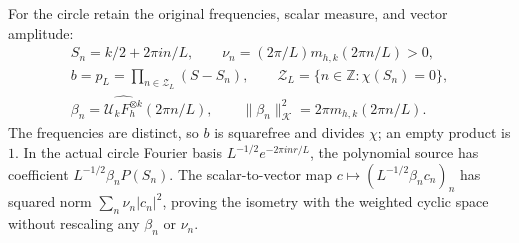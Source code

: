 \documentclass{article}
\begin{document}
For the circle retain the original frequencies, scalar measure, and
vector amplitude:
\[
 \begin{gathered}
 S_n=k/2+2\pi i n/L,\qquad
 \nu_n=(2\pi/L)m_{h,k}(2\pi n/L)>0,\\
 b=p_L=\prod_{n\in\mathcal Z_L}(S-S_n),\qquad
 \mathcal Z_L=\{n\in\mathbb Z:\chi(S_n)=0\},\\
 \beta_n=\widehat{\mathcal U_kF_h^{\otimes k}}(2\pi n/L),
 \qquad \|\beta_n\|_{\mathcal K}^2=2\pi m_{h,k}(2\pi n/L).
 \end{gathered}
 \tag{DC6}
\]
The frequencies are distinct, so $b$ is squarefree and divides
$\chi$; an empty product is $1$.
In the actual circle Fourier basis
$L^{-1/2}e^{-2\pi i nr/L}$, the polynomial source has coefficient
$L^{-1/2}\beta_nP(S_n)$.
The scalar-to-vector map
$c\mapsto(L^{-1/2}\beta_nc_n)_n$ has squared norm
$\sum_n\nu_n|c_n|^2$, proving the isometry with the weighted cyclic
space without rescaling any $\beta_n$ or $\nu_n$.
\end{document}
